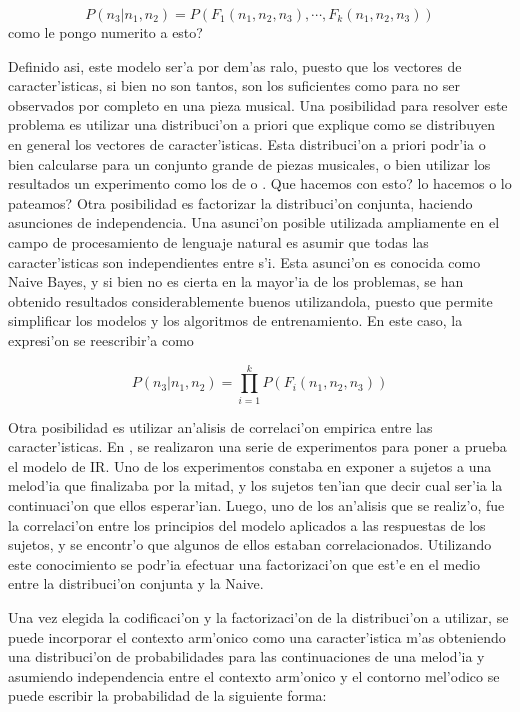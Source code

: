 $$P(n_3 | n_1, n_2) = P(F_1(n_1, n_2, n_3), \cdots, F_k(n_1, n_2, n_3))$$\alert{como le pongo numerito a esto?}

Definido asi, este modelo ser'a por dem'as ralo, puesto que los vectores de caracter'isticas, si bien no son tantos, son los suficientes como para no ser observados
por completo en una pieza musical. Una posibilidad para resolver este problema es utilizar una distribuci'on a priori que explique como se distribuyen en general
los vectores de caracter'isticas. Esta distribuci'on a priori podr'ia o bien calcularse para un conjunto grande de piezas musicales, o bien utilizar los resultados 
un experimento como los de \cite{Krumhansl95} o \cite{Schellenberg96}. \alert{Que hacemos con esto? lo hacemos o lo pateamos?} 
Otra posibilidad es factorizar la distribuci'on conjunta, haciendo asunciones de independencia. Una asunci'on posible utilizada ampliamente en el campo 
de procesamiento de lenguaje natural es asumir que todas las caracter'isticas son independientes entre s'i. Esta asunci'on es conocida como Naive Bayes, y
si bien no es cierta en la mayor'ia de los problemas, se han obtenido resultados considerablemente buenos utilizandola, puesto que permite simplificar
los modelos y los algoritmos de entrenamiento. En este caso, la expresi'on  se reescribir'a como

$$P(n_3 | n_1, n_2) = \prod_{i=1}^k P(F_i(n_1, n_2, n_3))$$

Otra posibilidad es utilizar an'alisis de correlaci'on empirica entre las caracter'isticas. En \cite{Schellenberg96}, se realizaron una serie
de experimentos para poner a prueba el modelo de IR. Uno de los experimentos constaba en exponer a sujetos a una melod'ia que finalizaba por la mitad, y los sujetos
ten'ian que decir cual ser'ia la continuaci'on que ellos esperar'ian. Luego, uno de los an'alisis que se realiz'o, fue la correlaci'on entre los principios del modelo
aplicados a las respuestas de los sujetos, y se encontr'o que algunos de ellos estaban correlacionados. Utilizando este conocimiento se podr'ia efectuar
una factorizaci'on que est'e en el medio entre la distribuci'on conjunta y la Naive.

Una vez elegida la codificaci'on y la factorizaci'on de la distribuci'on a utilizar, se puede incorporar el contexto arm'onico como una caracter'istica m'as 
obteniendo una distribuci'on de probabilidades para las continuaciones de una melod'ia y asumiendo independencia entre el contexto arm'onico y el contorno mel'odico
se puede escribir la probabilidad de la siguiente forma:

